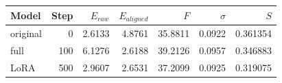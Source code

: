 \begin{center}
\small
\begin{tabular}{lrrrrrr}
\toprule
Model & Step & $E_{raw}$ & $E_{aligned}$ & $F$ & $\sigma$ & $S$\\
\midrule
original & 0 & 2.6133 & 4.8761 & 35.8811 & 0.0922 & 0.361354\\
full & 100 & 6.1276 & 2.6188 & 39.2126 & 0.0957 & 0.346883\\
LoRA & 500 & 2.9607 & 2.6531 & 37.2099 & 0.0925 & 0.319075\\
\bottomrule
\end{tabular}
\end{center}
